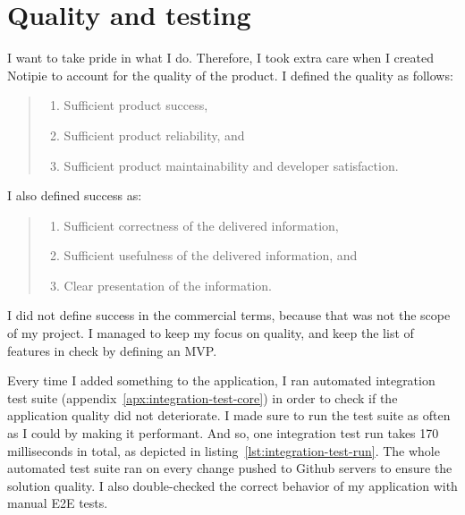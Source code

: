 \section{Quality and testing}\label{sec:quality}

I want to take pride in what I do.
Therefore,
I took extra care when I created Notipie
to account for the quality of the product.
I defined the quality as follows:

\begin{quote}
  \begin{enumerate}
    \item Sufficient product success,
    \item Sufficient product reliability, and
    \item Sufficient product maintainability and developer satisfaction.
  \end{enumerate}
\end{quote}

I also defined success as:

\begin{quote}
  \begin{enumerate}
    \item Sufficient correctness of the delivered information,
    \item Sufficient usefulness of the delivered information, and
    \item Clear presentation of the information.
  \end{enumerate}
\end{quote}

I did not define success in the commercial terms,
because that was not the scope of my project.
I managed to keep my focus on quality,
and keep the list of features in check
by defining an \ac{MVP}.

Every time I added something to the application,
I ran automated integration test suite
(appendix~\ref{apx:integration-test-core})
in order to check if the application quality
did not deteriorate.
I made sure to run the test suite as often as I could
by making it performant.
And so, one integration test run takes 170 milliseconds in total,
as depicted in listing~\ref{lst:integration-test-run}.
The whole automated test suite ran on every change
pushed to Github servers to ensure the solution quality.
I also double-checked the correct behavior
of my application with manual \ac{E2E} tests.




